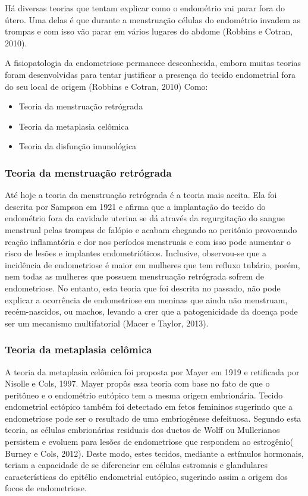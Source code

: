 \documentclass[12pt]{article} %
\begin{document}
Há diversas teorias que tentam explicar como o endométrio vai parar
fora do útero. Uma delas é que durante a menstruação células do
endométrio invadem as trompas e com isso vão parar em vários lugares
do abdome (Robbins e Cotran, 2010).


A fisiopatologia da endometriose permanece desconhecida, embora muitas
teorias foram desenvolvidas para tentar justificar a presença do
tecido endometrial fora do seu local de origem (Robbins e Cotran, 2010) Como:

\begin{itemize}
\item Teoria da menstruação retrógrada
\item Teoria da metaplasia celômica
\item Teoria da disfunção imunológica
\end{itemize}


\subsubsection{Teoria da menstruação retrógrada}

Até hoje a teoria da menstruação retrógrada é a teoria mais
aceita. Ela foi descrita por Sampson em 1921 e afirma que a
implantação do tecido do endométrio fora da cavidade uterina se dá
através da regurgitação do sangue menstrual pelas trompas de falópio e
acabam chegando ao peritônio provocando reação
inflamatória e dor nos períodos menstruais e com isso  pode aumentar o risco de lesões e implantes endometrióticos.  Inclusive, observou-se que
a incidência de endometriose é maior em mulheres que tem refluxo
tubário, porém, nem todas as mulheres que possuem menstruação
retrógrada sofrem de endometriose. No entanto, esta teoria que foi descrita no passado, não pode explicar a ocorrência de endometriose em meninas que ainda não menstruam, recém-nascidos, ou machos, levando a crer que a patogenicidade da doença pode ser um mecanismo multifatorial (Macer e Taylor, 2013).

\subsubsection{Teoria da metaplasia celômica}

A teoria da metaplasia celômica foi proposta por Mayer em 1919 e
retificada por Nisolle e Cols, 1997. Mayer propôs essa teoria com base
no fato de que o peritôneo e o endométrio eutópico tem a mesma origem
embrionária. Tecido endometrial ectópico também foi detectado em fetos femininos sugerindo que a endometriose pode ser o resultado de uma embriogênese defeituosa. Segundo esta teoria, as células embrionárias residuais dos ductos de Wolff ou Mullerianos persistem e evoluem para lesões de endometriose que respondem ao estrogênio( Burney e Cols, 2012). Deste modo, estes tecidos, mediante a estímulos
hormonais, teriam a capacidade de se diferenciar em células estromais
e glandulares características do epitélio endometrial eutópico,
sugerindo assim a origem dos focos de endometriose.
\end{document}
